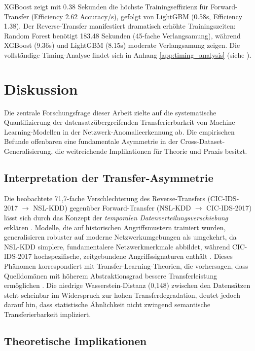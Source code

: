 \documentclass[11pt,a4paper]{article}
\begin{document}
    XGBoost zeigt mit 0.38 Sekunden die höchste Trainingseffizienz für Forward-Transfer (Efficiency 2.62 Accuracy/s), gefolgt von LightGBM (0.58s, Efficiency 1.38). Der Reverse-Transfer manifestiert dramatisch erhöhte Trainingszeiten: Random Forest benötigt 183.48 Sekunden (45-fache Verlangsamung), während XGBoost (9.36s) und LightGBM (8.15s) moderate Verlangsamung zeigen. Die vollständige Timing-Analyse findet sich in Anhang \ref{app:timing_analysis} (siehe \parencite{Weirauch2025}).

    \section{Diskussion}

    Die zentrale Forschungsfrage dieser Arbeit zielte auf die systematische Quantifizierung der datensatzübergreifenden Transferierbarkeit von Machine-Learning-Modellen in der Netzwerk-Anomalieerkennung ab. Die empirischen Befunde offenbaren eine fundamentale Asymmetrie in der Cross-Dataset-Generalisierung, die weitreichende Implikationen für Theorie und Praxis besitzt.

    \subsection{Interpretation der Transfer-Asymmetrie}

    Die beobachtete 71,7-fache Verschlechterung des Reverse-Transfers (CIC-IDS-2017 $\rightarrow$ NSL-KDD) gegenüber Forward-Transfer (NSL-KDD $\rightarrow$ CIC-IDS-2017) lässt sich durch das Konzept der \textit{temporalen Datenverteilungsverschiebung} erklären \parencite{Ring2019}. Modelle, die auf historischen Angriffsmustern trainiert wurden, generalisieren robuster auf moderne Netzwerkumgebungen als umgekehrt, da NSL-KDD simplere, fundamentalere Netzwerkmerkmale abbildet, während CIC-IDS-2017 hochspezifische, zeitgebundene Angriffssignaturen enthält \parencite{Sharafaldin2018}. Dieses Phänomen korrespondiert mit Transfer-Learning-Theorien, die vorhersagen, dass Quelldomänen mit höherem Abstraktionsgrad bessere Transferleistung ermöglichen \parencite{Goodfellow2016}. Die niedrige Wasserstein-Distanz (0,148) zwischen den Datensätzen steht scheinbar im Widerspruch zur hohen Transferdegradation, deutet jedoch darauf hin, dass statistische Ähnlichkeit nicht zwingend semantische Transferierbarkeit impliziert.

    \subsection{Theoretische Implikationen}
\end{document}
